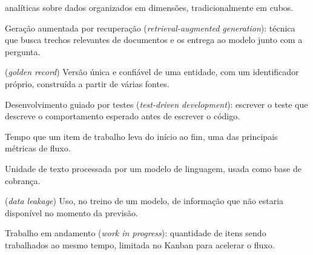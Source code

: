 \begin{description}[style=nextline, leftmargin=1.5em, font=\normalfont\scshape]
    analíticas sobre dados organizados em dimensões, tradicionalmente em cubos.
  \item[RAG] Geração aumentada por recuperação (\emph{retrieval-augmented generation}): técnica
    que busca trechos relevantes de documentos e os entrega ao modelo junto com a pergunta.
  \item[Registro mestre] (\emph{golden record}) Versão única e confiável de uma entidade, com um
    identificador próprio, construída a partir de várias fontes.
  \item[TDD] Desenvolvimento guiado por testes (\emph{test-driven development}): escrever o teste
    que descreve o comportamento esperado antes de escrever o código.
  \item[Tempo de ciclo] Tempo que um item de trabalho leva do início ao fim, uma das principais
    métricas de fluxo.
  \item[Token] Unidade de texto processada por um modelo de linguagem, usada como base de
    cobrança.
  \item[Vazamento de dados] (\emph{data leakage}) Uso, no treino de um modelo, de informação que
    não estaria disponível no momento da previsão.
  \item[WIP] Trabalho em andamento (\emph{work in progress}): quantidade de itens sendo trabalhados
    ao mesmo tempo, limitada no Kanban para acelerar o fluxo.
\end{description}
